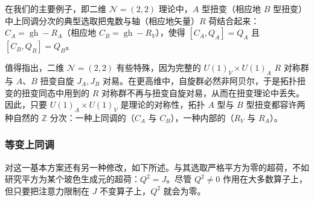 在我们的主要例子，即二维 $\mathcal{N}=(2,2)$ 理论中，$A$ 型扭变（相应地 $B$ 型扭变）中上同调分次的典型选取把鬼数与轴（相应地矢量）$R$ 荷结合起来：$C_A=\operatorname{gh}-R_A$（相应地 $C_B=\operatorname{gh}-R_V$），使得 $[C_A,Q_A]=Q_A$ 且 $[C_B,Q_B]=Q_B$。

值得指出，二维 $\mathcal{N}=(2,2)$ 有些特殊，因为完整的 $U(1)_V\times U(1)_A$ $R$ 对称群与 $A$、$B$ 扭变自旋 $J_A,J_B$ 对易。在更高维中，自旋群必然非阿贝尔，于是拓扑扭变的扭变同态中用到的 $R$ 对称群不再与扭变自旋对易，从而在扭变理论中丢失。因此，只要 $U(1)_A\times U(1)_V$ 是理论的对称性，拓扑 $A$ 型与 $B$ 型扭变都容许两种自然的 $\mathbb{Z}$ 分次：一种上同调的（$C_A$ 与 $C_B$），一种内部的（$R_V$ 与 $R_A$）。

\subsubsection{等变上同调}

对这一基本方案还有另一种修改，如下所述。与其选取严格平方为零的超荷，不如研究平方为某个玻色生成元的超荷：$Q^2=J$。尽管 $Q^2\neq 0$ 作用在大多数算子上，但只要把注意力限制在 $J$ 不变算子上，$Q^2$ 就会为零。
